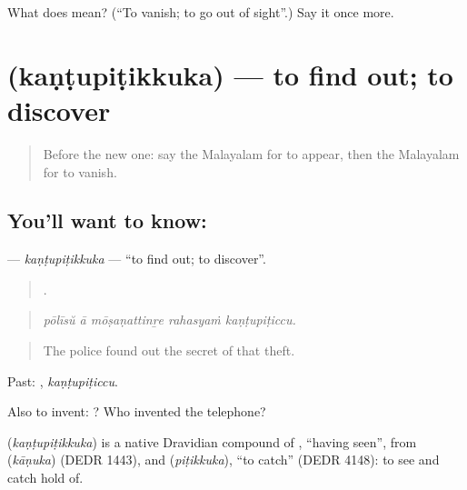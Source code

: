 \begin{tcolorbox}[breakable,colback=teal!4,colframe=teal!35!black,title={Before you move on}]
What does  mean? (\textquotedblleft{}To vanish; to go out of sight\textquotedblright{}.) Say it once more.
\end{tcolorbox}
\section[\texorpdfstring{\ml{കണ്ടുപിടിക്കുക} (kaṇṭupiṭikkuka)}{കണ്ടുപിടിക്കുക (kaṇṭupiṭikkuka)}]{ (kaṇṭupiṭikkuka) — to find out; to discover}

\label{lesson:ML-C383-kantupitikkuka}



\begin{quote}
Before the new one: say the Malayalam for to appear, then the Malayalam for to vanish.
\end{quote}

\subsection*{You'll want to know: }
\textbf{} — \emph{kaṇṭupiṭikkuka} — \textquotedblleft{}to find out; to discover\textquotedblright{}.

\begin{quote}
    .
\end{quote}

\begin{quote}
\emph{pōlīsŭ ā mōṣaṇattinṟe rahasyaṁ kaṇṭupiṭiccu.}
\end{quote}

\begin{quote}
The police found out the secret of that theft.
\end{quote}

Past: , \emph{kaṇṭupiṭiccu}.

Also to invent:   ? Who invented the telephone?

\begin{cousinweb}
\textbf{} (\emph{kaṇṭupiṭikkuka}) is a native Dravidian compound of , \textquotedblleft{}having seen\textquotedblright{}, from  (\emph{kāṇuka}) (DEDR 1443), and  (\emph{piṭikkuka}), \textquotedblleft{}to catch\textquotedblright{} (DEDR 4148): to see and catch hold of.
\end{cousinweb}

